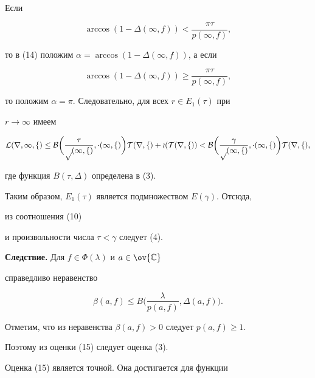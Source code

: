 Если 


$$ 


\arccos(1-\Delta(\infty,f))<\frac{\pi\tau}{p(\infty,f)}, 


$$ 


то в (14) положим $\alpha=\arccos(1-\Delta(\infty,f))$, а если 


$$ 


\arccos(1-\Delta(\infty,f))\ge\frac{\pi\tau}{p(\infty,f)}, 


$$ 


то положим $\alpha=\pi$. Следовательно, для всех $r\in E_1(\tau)$ при 


$r\to\infty$ имеем 


$$ 


\cal L(r,\infty,f)\le B\bigg(\frac{\tau}{p(\infty,f)}, 


\Delta(\infty,f)\bigg)T(r,f)+ o(T(r,f))< B\bigg( 


\frac{\gamma}{p(\infty,f)},\Delta(\infty,f)\bigg)T(r,f), 


$$ 


где функция $B(\tau,\Delta)$ определена в (3). 


 


Таким образом, $E_1(\tau)$ является подмножеством $E(\gamma)$. Отсюда, 


из соотношения (10) 


и произвольности числа $\tau<\gamma$ следует (4). 


\medskip 


 


{\bf Следствие.} Для $f\in\Phi(\lambda)$ и $a\in\ov{\Bbb C}$ 


справедливо неравенство 


\begin{equation} 


\beta(a,f)\le B\bigg(\frac{\lambda}{p(a,f)}, 


\Delta(a,f)\bigg). 


\end{equation} 


 


Отметим, что из неравенства $\beta(a,f)>0$ следует $p(a,f)\ge1$. 


Поэтому из оценки (15) следует оценка (3). 


 


Оценка (15) является точной. Она достигается для функции 


